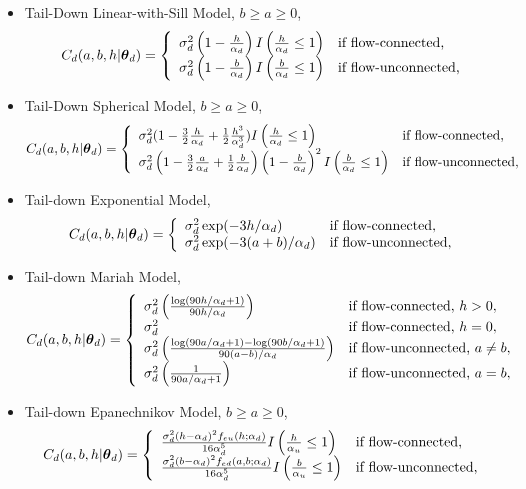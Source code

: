 \documentclass[nojss]{jss}
\def\btheta{\mbox{\boldmath $\theta$}}
\begin{document}
\begin{itemize}
\item Tail-Down Linear-with-Sill Model, $b \geq a \geq 0$,
  \[
  C_d(a,b,h|\btheta_d)= \left\{ \begin{array}{ll}
      \sigma^2_d\left(1 -\frac{h}{\alpha_d}\right)I\left(\frac{h}{\alpha_d}\leq 1\right) &
      \textrm{if flow-connected,}\\
      \sigma^2_d\left(1 -\frac{b}{\alpha_d}\right)I\left(\frac{b}{\alpha_d}\leq 1\right) &
      \textrm{if flow-unconnected,}
    \end{array} \right.
  \]
\item Tail-Down Spherical Model, $b \geq a \geq 0$,
  \[
  C_d(a,b,h|\btheta_d)= \left\{ \begin{array}{ll}
      \sigma^2_d(1-\frac{3}{2}\frac{h}{\alpha_d}+\frac{1}{2}\frac{h^3}{\alpha_d^3})I\left(\frac{h}{\alpha_d}\leq 1\right) &
      \textrm{if flow-connected,}\\
      \sigma^2_d\left(1-\frac{3}{2}\frac{a}{\alpha_d}+\frac{1}{2}\frac{b}{\alpha_d}\right)
      \left(1- \frac{b}{\alpha_d}\right)^2I\left(\frac{b}{\alpha_d}\leq 1\right) &
      \textrm{if flow-unconnected,}
    \end{array} \right.
  \]
\item Tail-down Exponential Model,
  \[
  C_d(a,b,h|\btheta_d)= \left\{ \begin{array}{ll}
      \sigma^2_d\exp(-3h/\alpha_d) &
      \textrm{if flow-connected,}\\
      \sigma^2_d\exp(-3(a+b)/\alpha_d) &
      \textrm{if flow-unconnected,}
    \end{array} \right.
  \]
\item Tail-down Mariah Model,
  \[
  C_d(a,b,h|\btheta_d)= \left\{ \begin{array}{ll}
      \sigma^2_d\left(\frac{\log(90h/\alpha_d+1)}{90h/\alpha_d}\right) &
      \textrm{if flow-connected, } h > 0,\\
      \sigma^2_d	& \textrm{if flow-connected, } h = 0,\\
      \sigma^2_d\left(\frac{\log(90a/\alpha_d+1)-\log(90b/\alpha_d+1)}{90(a-b)/\alpha_d}\right) &
      \textrm{if flow-unconnected, } a \ne b, \\
      \sigma^2_d\left(\frac{1}{90a/\alpha_d+1}\right) &
      \textrm{if flow-unconnected, } a = b,
    \end{array} \right.
  \]
\item Tail-down Epanechnikov Model, $b \geq a \geq 0$,
  \[
  C_d(a,b,h|\btheta_d)= \left\{ \begin{array}{ll}
      \frac{\sigma^2_d(h-\alpha_d)^2f_{eu}(h;\alpha_d)}{16\alpha_d^5} 
	I\left(\frac{h}{\alpha_u}\leq 1\right) &
      \textrm{if flow-connected,}\\
      \frac{\sigma^2_d(b-\alpha_d)^2f_{ed}(a,b;\alpha_d)}{16\alpha_d^5} 
	I\left(\frac{b}{\alpha_u}\leq 1\right) &
      \textrm{if flow-unconnected,}
    \end{array} \right.
  \]
\end{itemize}
\end{document}
